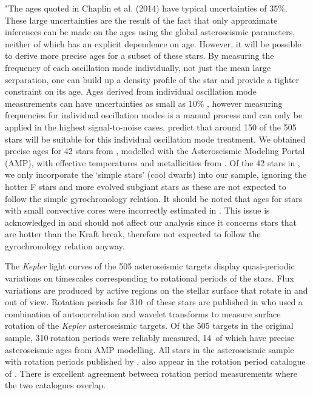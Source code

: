 \documentclass[10pt,preprint]{aastex}
\newcommand{\nastero}{310}
\newcommand{\nprecise}{14~}
\newcommand{\ngarcia}{310~}
\begin{document}
"The ages quoted in Chaplin et al. (2014) have typical uncertainties of 35\%.
These large uncertainties are the result of the fact that only approximate inferences can be made on the ages using the global asteroseismic parameters, neither of which has an explicit dependence on age.
However, it will be possible to derive more precise ages for a subset of these stars.
By measuring the frequency of each oscillation mode individually, not just the mean large serparation, one can build up a density profile of the star and provide a tighter constraint on its age.
Ages derived from individual oscillation mode measurements can have uncertainties as small as 10\% \citep{Brown1994, SilvaAguirre2013}, however measuring frequencies for individual oscillation modes is a manual process and can only be applied in the highest signal-to-noise cases.
\citet{Chaplin2014} predict that around 150 of the 505 stars will be suitable for this individual oscillation mode treatment.
We obtained precise ages for 42 stars from \citet{Metcalfe2014}, modelled with the Asteroseismic Modeling Portal (AMP), with effective temperatures and metallicities from \citet{Bruntt2012}.
Of the 42 stars in \citet{Metcalfe2014}, we only incorporate the `simple stars' (cool dwarfs) into our sample, ignoring the hotter F stars and more evolved subgiant stars as these are not expected to follow the simple gyrochronology relation.
It should be noted that ages for stars with small convective cores were incorrectly estimated in \citet{Chaplin2014}.
This issue is acknowledged in \citet{Metcalfe2014} and should not affect our analysis since it concerns stars that are hotter than the Kraft break, therefore not expected to follow the gyrochronology relation anyway.

The {\it Kepler} light curves of the 505 asteroseismic targets display quasi-periodic variations on timescales corresponding to rotational periods of the stars.
Flux variations are produced by active regions on the stellar surface that rotate in and out of view.
Rotation periods for \ngarcia of these stars are published in \citet{Garcia2014} who used a combination of autocorrelation and wavelet transforms to measure surface rotation of the {\it Kepler} asteroseismic targets.
Of the 505 targets in the original sample, \nastero$~$rotation periods were reliably measured, \nprecise of which have precise asteroseismic ages from AMP modelling.
All stars in the asteroseismic sample with rotation periods published by \citet{McQuillan_2014}, also appear in the rotation period catalogue of \citet{Garcia2014}.
There is excellent agreement between rotation period measurements where the two catalogues overlap.
\end{document}
